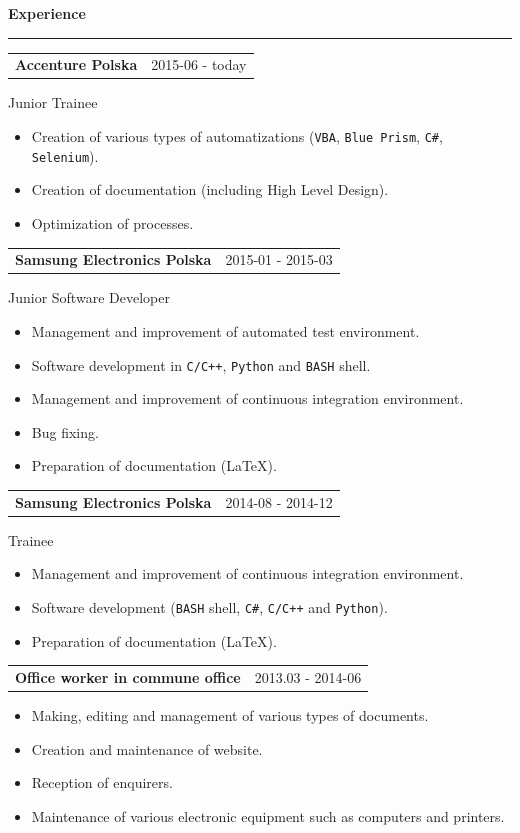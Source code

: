\documentclass{article}
\newcommand{\header}[1] 
{
	\textbf{\large #1}
	\vspace{0.005\textheight}
	\hrule 
	\vspace{0.005\textheight}
}
\begin{document}
\header{Experience}

\begin{tabular}{@{} m{} R{0.37\textwidth} }
\textbf{Accenture Polska}	& {2015-06 - today} 
\end{tabular}
Junior Trainee\\
\begin{itemize}
	\item Creation of various types of automatizations (\texttt{VBA}, \texttt{Blue Prism}, \texttt{C\#}, \texttt{Selenium}).
	\item Creation of documentation (including High Level Design).
	\item Optimization of processes. 
\end{itemize}

\begin{tabular}{@{} m{} R{0.37\textwidth} }
\textbf{Samsung Electronics Polska}	& {2015-01 - 2015-03} 
\end{tabular}
Junior Software Developer\\
\begin{itemize}
	\item Management and improvement of automated test environment.
	\item Software development in \texttt{C/C++}, \texttt{Python} and \texttt{BASH} shell.
	\item Management and improvement of continuous integration environment.
	\item Bug fixing.
	\item Preparation of documentation (\LaTeX).
\end{itemize}

\begin{tabular}{@{} m{} R{0.37\textwidth} }
	\textbf{Samsung Electronics Polska}	& {2014-08 - 2014-12} 
\end{tabular}
Trainee\\
\begin{itemize}
	\item Management and improvement of continuous integration environment.
	\item Software development (\texttt{BASH} shell, \texttt{C\#}, \texttt{C/C++} and \texttt{Python}).
	\item Preparation of documentation (\LaTeX). 
\end{itemize}

\begin{tabular}{@{} m{} R{0.37\textwidth} }
\textbf{Office worker in commune office} & {2013.03 - 2014-06} 
\end{tabular}
\begin{itemize}
	\item Making, editing and management of various types of documents.
	\item Creation and maintenance of website.
	\item Reception of enquirers.
	\item Maintenance of various electronic equipment such as computers and printers.
\end{itemize}
\end{document}
